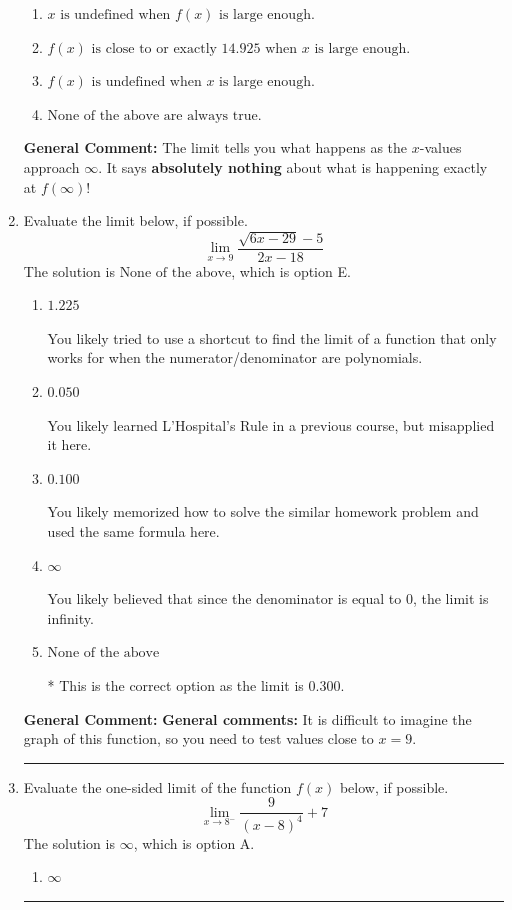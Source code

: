 \documentclass{extbook}[14pt]
\newcommand{\litem}[1]{\item #1

\rule{\textwidth}{0.4pt}}
\begin{document}
\begin{enumerate}
{\begin{enumerate}[label=\Alph*.]
\item \( x \text{ is undefined when } f(x) \text{ is large enough}. \)


\item \( f(x) \text{ is close to or exactly } 14.925 \text{ when } x \text{ is large enough}. \)


\item \( f(x) \text{ is undefined when } x \text{ is large enough}. \)


\item \( \text{None of the above are always true.} \)


\end{enumerate}

\textbf{General Comment:} The limit tells you what happens as the $x$-values approach $\infty$. It says \textbf{absolutely nothing} about what is happening exactly at $f(\infty)$!
}
\litem{
Evaluate the limit below, if possible.
\[ \lim_{x \rightarrow 9} \frac{\sqrt{6x - 29} - 5}{2x - 18} \]The solution is \( \text{None of the above} \), which is option E.\begin{enumerate}[label=\Alph*.]
\item \( 1.225 \)

You likely tried to use a shortcut to find the limit of a function that only works for when the numerator/denominator are polynomials.
\item \( 0.050 \)

You likely learned L'Hospital's Rule in a previous course, but misapplied it here.
\item \( 0.100 \)

You likely memorized how to solve the similar homework problem and used the same formula here.
\item \( \infty \)

You likely believed that since the denominator is equal to 0, the limit is infinity.
\item \( \text{None of the above} \)

* This is the correct option as the limit is 0.300.
\end{enumerate}

\textbf{General Comment:} \textbf{General comments:} It is difficult to imagine the graph of this function, so you need to test values close to $x = 9$.
}
\litem{
Evaluate the one-sided limit of the function $f(x)$ below, if possible.
\[ \lim_{x \rightarrow 8^-} \frac{9}{(x-8)^4}+7 \]The solution is \( \infty \), which is option A.\begin{enumerate}[label=\Alph*.]
\item \( \infty \)



\end{enumerate}}
\end{enumerate}
\end{document}
